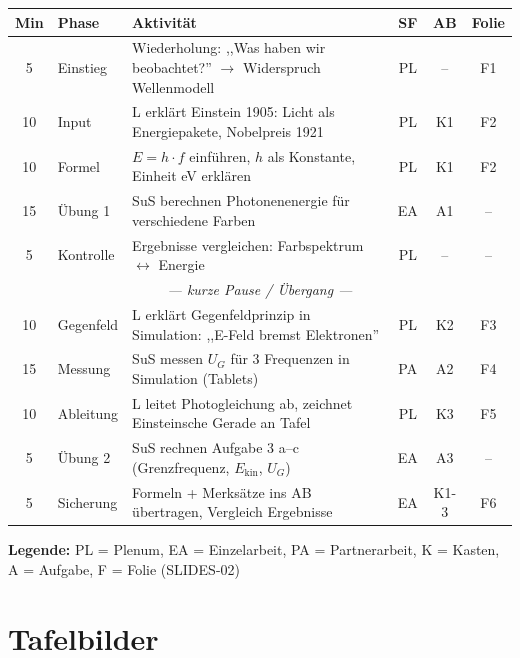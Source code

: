 \documentclass[11pt,a4paper]{article}
\begin{document}
\begin{tabularx}{\textwidth}{|c|l|X|c|c|c|}
\hline
\rowcolor{physiklight}
\textbf{Min} & \textbf{Phase} & \textbf{Aktivität} & \textbf{SF} & \textbf{AB} & \textbf{Folie} \\
\hline
5 & Einstieg & Wiederholung: ,,Was haben wir beobachtet?'' $\rightarrow$ Widerspruch Wellenmodell & PL & -- & F1 \\
\hline
10 & Input & L erklärt Einstein 1905: Licht als Energiepakete, Nobelpreis 1921 & PL & K1 & F2 \\
\hline
10 & Formel & $E = h \cdot f$ einführen, $h$ als Konstante, Einheit eV erklären & PL & K1 & F2 \\
\hline
15 & Übung 1 & SuS berechnen Photonenenergie für verschiedene Farben & EA & A1 & -- \\
\hline
5 & Kontrolle & Ergebnisse vergleichen: Farbspektrum $\leftrightarrow$ Energie & PL & -- & -- \\
\hline
\multicolumn{6}{|c|}{\cellcolor{gray!20}\textit{--- kurze Pause / Übergang ---}} \\
\hline
10 & Gegenfeld & L erklärt Gegenfeldprinzip in Simulation: ,,E-Feld bremst Elektronen'' & PL & K2 & F3 \\
\hline
15 & Messung & SuS messen $U_G$ für 3 Frequenzen in Simulation (Tablets) & PA & A2 & F4 \\
\hline
10 & Ableitung & L leitet Photogleichung ab, zeichnet Einsteinsche Gerade an Tafel & PL & K3 & F5 \\
\hline
5 & Übung 2 & SuS rechnen Aufgabe 3 a--c (Grenzfrequenz, $E_{\text{kin}}$, $U_G$) & EA & A3 & -- \\
\hline
5 & Sicherung & Formeln + Merksätze ins AB übertragen, Vergleich Ergebnisse & EA & K1-3 & F6 \\
\hline
\end{tabularx}

\vspace{0.5em}

\textbf{Legende:} PL = Plenum, EA = Einzelarbeit, PA = Partnerarbeit, K = Kasten, A = Aufgabe, F = Folie (SLIDES-02)

\newpage


\section*{Tafelbilder}
\end{document}
